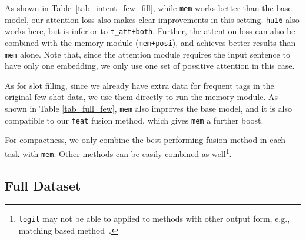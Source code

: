 As shown in Table~\ref{tab_intent_few_fill}, while \texttt{mem} works better than the base model, our attention loss also makes clear improvements in this setting.
\texttt{hu16} also works here, but is inferior to \texttt{t\_att+both}.
Further, the attention loss can also be combined with the memory module (\texttt{mem+posi}), and achieves better results than \texttt{mem} alone.
Note that, since the attention module requires the input sentence to have only one embedding, we only use one set of possitive attention in this case.

As for slot filling, since we already have extra data for frequent tags in the original few-shot data, we use them directly to run the memory module. As shown in Table \ref{tab_full_few}, \texttt{mem} also improves the base model, and it is also compatible to our \texttt{feat} fusion method, which gives \texttt{mem} a further boost.

For compactness, we only combine the best-performing fusion method in each task with \texttt{mem}. Other methods can be easily combined as well\footnote{
\texttt{logit} may not be able to applied to methods with other output form, e.g., matching based method~\cite{koch2015siamese}.}.



\subsection{Full Dataset}

